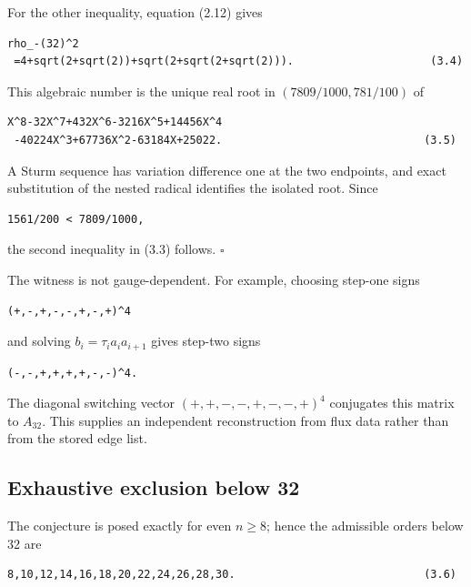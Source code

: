 For the other inequality, equation (2.12) gives

\begin{lstlisting}[language={}]
rho_-(32)^2
 =4+sqrt(2+sqrt(2))+sqrt(2+sqrt(2+sqrt(2))).                     (3.4)
\end{lstlisting}

This algebraic number is the unique real root in \((7809/1000,781/100)\) of

\begin{lstlisting}[language={}]
X^8-32X^7+432X^6-3216X^5+14456X^4
 -40224X^3+67736X^2-63184X+25022.                               (3.5)
\end{lstlisting}

A Sturm sequence has variation difference one at the two endpoints, and
exact substitution of the nested radical identifies the isolated root.
Since

\begin{lstlisting}[language={}]
1561/200 < 7809/1000,
\end{lstlisting}

the second inequality in (3.3) follows. \(\square\)

The witness is not gauge-dependent. For example, choosing step-one signs

\begin{lstlisting}[language={}]
(+,-,+,-,-,+,-,+)^4
\end{lstlisting}

and solving \(b_i=\tau_i a_i a_{i+1}\) gives step-two signs

\begin{lstlisting}[language={}]
(-,-,+,+,+,+,-,-)^4.
\end{lstlisting}

The diagonal switching vector
\((+,+,-,-,+,-,-,+)^4\) conjugates this matrix to \(A_32\). This supplies an
independent reconstruction from flux data rather than from the stored edge
list.

\subsection{Exhaustive exclusion below 32}

The conjecture is posed exactly for even \(n\ge 8\); hence the admissible orders
below 32 are

\begin{lstlisting}[language={}]
8,10,12,14,16,18,20,22,24,26,28,30.                             (3.6)
\end{lstlisting}

